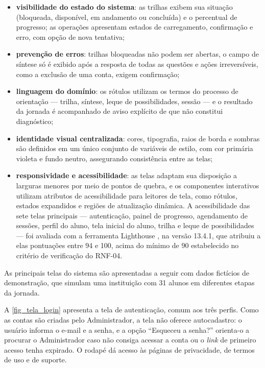 \begin{itemize}
  \item \textbf{visibilidade do estado do sistema}: as trilhas exibem sua situação (bloqueada, disponível, em andamento ou concluída) e o percentual de progresso; as operações apresentam estados de carregamento, confirmação e erro, com opção de nova tentativa;
  \item \textbf{prevenção de erros}: trilhas bloqueadas não podem ser abertas, o campo de síntese só é exibido após a resposta de todas as questões e ações irreversíveis, como a exclusão de uma conta, exigem confirmação;
  \item \textbf{linguagem do domínio}: os rótulos utilizam os termos do processo de orientação — trilha, síntese, leque de possibilidades, sessão — e o resultado da jornada é acompanhado de aviso explícito de que não constitui diagnóstico;
  \item \textbf{identidade visual centralizada}: cores, tipografia, raios de borda e sombras são definidos em um único conjunto de variáveis de estilo, com cor primária violeta e fundo neutro, assegurando consistência entre as telas;
  \item \textbf{responsividade e acessibilidade}: as telas adaptam sua disposição a larguras menores por meio de pontos de quebra, e os componentes interativos utilizam atributos de acessibilidade para leitores de tela, como rótulos, estados expandidos e regiões de atualização dinâmica. A acessibilidade das sete telas principais --- autenticação, painel de progresso, agendamento de sessões, perfil do aluno, tela inicial do aluno, trilha e leque de possibilidades --- foi avaliada com a ferramenta Lighthouse \cite{google2025lighthouse}, na versão 13.4.1, que atribuiu a elas pontuações entre 94 e 100, acima do mínimo de 90 estabelecido no critério de verificação do RNF-04.
\end{itemize}

As principais telas do sistema são apresentadas a seguir com dados fictícios de demonstração, que simulam uma instituição com 31 alunos em diferentes etapas da jornada.

A \autoref{fig_tela_login} apresenta a tela de autenticação, comum aos três perfis. Como as contas são criadas pelo Administrador, a tela não oferece autocadastro: o usuário informa o e-mail e a senha, e a opção ``Esqueceu a senha?'' orienta-o a procurar o Administrador caso não consiga acessar a conta ou o \textit{link} de primeiro acesso tenha expirado. O rodapé dá acesso às páginas de privacidade, de termos de uso e de suporte.

